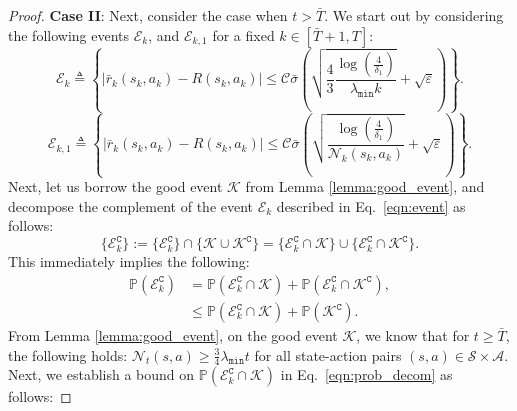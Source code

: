 \documentclass{article}
\newcommand{\mc}{\mathcal}
\begin{document}
\begin{proof}
\textbf{Case II}: Next, consider the case when \(t > \bar{T}\). We start out by considering the following events \(\mathcal{E}_k\), and \(\mathcal{E}_{k,1}\) for a fixed $k \in [\bar{T}+1, T]$:
\begin{equation}\label{eqn:event}
     \mathcal{E}_k \triangleq \left\{ \left \lvert \bar{r}_k(s_k,a_k) - R(s_k,a_k) \right \rvert \le \mc{C}\bar{\sigma}\left( \sqrt{\frac{4}{3}\frac{\log\left(\frac{4}{\delta_1}\right)}{\lambda_{\texttt{min}}k}} + \sqrt{\varepsilon}\right) \right\}.
\end{equation}
\begin{equation}\label{eqn:event_1}
     \mathcal{E}_{k,1} \triangleq \left\{ \left \lvert \bar{r}_k(s_k,a_k) - R(s_k,a_k) \right \rvert \le \mc{C}\bar{\sigma}\left( \sqrt{\frac{\log\left(\frac{4}{\delta_1}\right)}{\mc{N}_k(s_k,a_k)}} + \sqrt{\varepsilon}\right) \right\}.
\end{equation}
Next, let us borrow the good event \(\mc{K}\) from Lemma \ref{lemma:good_event}, and decompose the complement of the event \(\mc{E}_k\) described in Eq.~\eqref{eqn:event} as follows:
\begin{equation}\label{eqn:probability_decomposition}
    \{\mathcal{E}_k^{\texttt{C}}\} := \{\mathcal{E}_k^{\texttt{C}}\}\cap\{\mathcal{K} \cup \mathcal{K}^\texttt{C}\}= \{\mathcal{E}_k^{\texttt{C}} \cap \mathcal{K}\} \cup \{\mathcal{E}_k^{\texttt{C}} \cap \mathcal{K}^\texttt{C}\}.
\end{equation}
This immediately implies the following:
\begin{equation}\label{eqn:prob_decom}
    \begin{aligned}
        \mathbb{P}(\mathcal{E}_k^{\texttt{C}}) &= \mathbb{P}(\mathcal{E}_k^{\texttt{C}} \cap \mathcal{K}) + \mathbb{P}(\mathcal{E}_k^{\texttt{C}} \cap \mathcal{K}^\texttt{C}),\\ 
    &\le \mathbb{P}(\mathcal{E}_k^{\texttt{C}} \cap \mathcal{K}) + \mathbb{P}(\mathcal{K}^\texttt{C}).
   \end{aligned}
\end{equation}
From Lemma \ref{lemma:good_event}, on the good event $\mc{K}$, we know that for $t \geq \bar{T}$, the following holds: $\mc{N}_t(s,a) \geq \frac{3}{4} \lambda_{\texttt{min}} t$ for all state-action pairs \((s,a) \in \mc{S} \times \mc{A}\). Next, we establish a bound on $\mathbb{P}(\mathcal{E}_k^{\texttt{C}} \cap \mathcal{K})$ in  Eq.~\eqref{eqn:prob_decom} as follows:

\end{proof}
\end{document}
